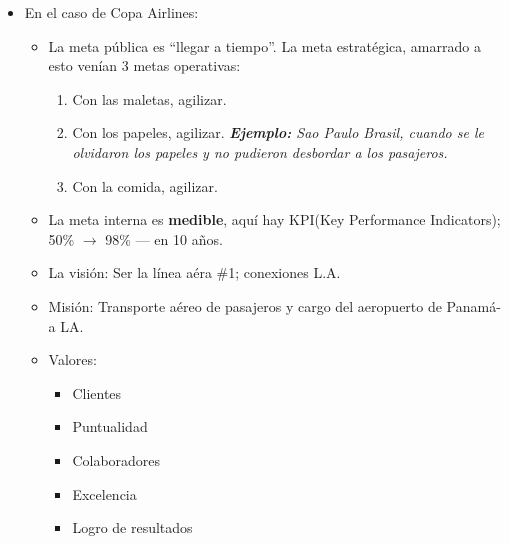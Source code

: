 \begin{itemize}
    \item En el caso de Copa Airlines:
        \begin{itemize}
            \item La meta pública es ``llegar a tiempo''. La meta estratégica, amarrado a esto venían 3 metas operativas:
                \begin{enumerate}
                    \item Con las maletas, agilizar.
                    \item Con los papeles, agilizar. \emph{\textbf{Ejemplo: }Sao Paulo Brasil, cuando se le olvidaron los papeles y no pudieron desbordar a los pasajeros.}
                    \item Con la comida, agilizar. 
                \end{enumerate}
            \item La meta interna es \textbf{medible}, aquí hay KPI(Key Performance Indicators); 50\% $\rightarrow$ 98\% --- en 10 años.
            \item La visión: Ser la línea aéra \#1; conexiones L.A.
            \item Misión: Transporte aéreo de pasajeros y cargo del aeropuerto de Panamá- a LA.
            \item Valores:
                \begin{itemize}
                    \item Clientes 
                    \item Puntualidad 
                    \item Colaboradores 
                    \item Excelencia 
                    \item Logro de resultados
                \end{itemize}
        \end{itemize}
\end{itemize}
